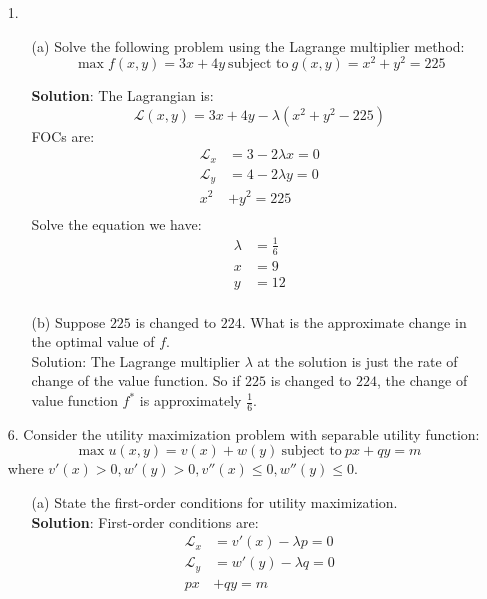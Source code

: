\documentclass{article}
\begin{document}
\begin{enumerate}
    \item[1. ] 
        \begin{enumerate}
            \item[(a)] Solve the following problem using the Lagrange multiplier method: $$ \max{ f(x,y)=3x+4y }\ \textrm{subject to}\ g(x,y)=x^2+y^2 = 225 $$
            
            \textbf{Solution}: The Lagrangian is:
            $$ \mathcal{L}(x,y) = 3x+4y-\lambda(x^2+y^2-225) $$
            FOCs are:
            \begin{align*}
                \mathcal{L}_x &= 3 - 2\lambda x = 0 \\
                \mathcal{L}_y &= 4 - 2\lambda y = 0 \\
                x^2 &+ y^2 = 225 \\
            \end{align*}
            Solve the equation we have:
            \begin{align*}
                \lambda &= \frac{1}{6} \\
                x &= 9 \\
                y &= 12 \\
            \end{align*}
            
            \item[(b)] Suppose $225$ is changed to $224$. What is the approximate change in the optimal value of $f$. \\
            
            \textrm{Solution}: The Lagrange multiplier $\lambda$ at the solution is just the rate of change of the value function. So if $225$ is changed to $224$, the change of value function $f^*$ is approximately $\frac{1}{6}$.
            
        \end{enumerate}
    
    \item[6. ] Consider the utility maximization problem with separable utility function: $$ \max{u(x,y)=v(x)+w(y)}\ \textrm{subject to}\ px + qy = m $$ where $v'(x)>0,w'(y)>0,v''(x)\leq 0,w''(y)\leq 0$.
        \begin{enumerate}
            \item[(a)] State the first-order conditions for utility maximization.\\
            
            \textbf{Solution}: First-order conditions are:
            \begin{align*}
                \mathcal{L}_x &= v'(x) - \lambda p = 0 \\
                \mathcal{L}_y &= w'(y) - \lambda q = 0 \\
                px &+ qy = m \\
            \end{align*}
            

\end{enumerate}
\end{enumerate}
\end{document}
